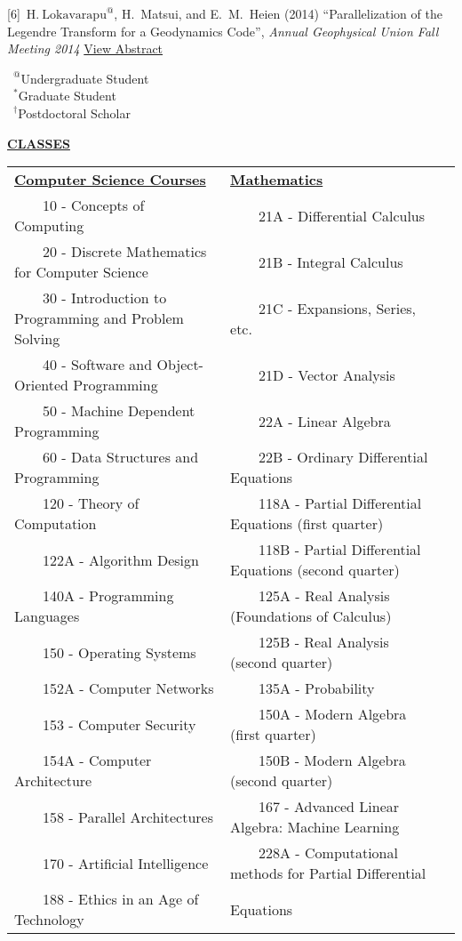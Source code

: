 \documentclass[11pt]{ltxdoc}
\newcommand{\tabitem}{~~\llap{\textbullet}~~}
\begin{document}
\hangindent 20pt
[6]~$\mathrm{H.~Lokavarapu}^{@}$, H.~Matsui, and E.~M.~Heien (2014) 
``Parallelization of the Legendre Transform for a Geodynamics Code'', 
\textit{Annual Geophysical Union Fall Meeting 2014}
\href{http://adsabs.harvard.edu/abs/2014AGUFMDI11A4255L}{View Abstract}

\vskip 18pt

$\phantom{0}^@$Undergraduate Student        \\
$\phantom{0}^*$Graduate Student             \\
$\phantom{0}^{\dagger}$Postdoctoral Scholar

\begin{center}
  \textbf{\underline{CLASSES}}
\end{center}

\vskip -6pt

\begin{tabular}{lll}
  \textbf{\underline{Computer Science Courses}} & \textbf{\underline{Mathematics}} \\
  \tabitem 10 - Concepts of Computing & \tabitem 21A - Differential Calculus \\
  \tabitem 20 - Discrete Mathematics for Computer Science & 	\tabitem 21B - Integral Calculus \\
  \tabitem 30 - Introduction to Programming and Problem Solving & 	\tabitem 21C - Expansions, Series, etc. \\
  \tabitem 40 - Software and Object-Oriented Programming & 	\tabitem 21D - Vector Analysis \\
  \tabitem 50 - Machine Dependent Programming & 	\tabitem 22A - Linear Algebra \\
  \tabitem 60 - Data Structures and Programming & 	\tabitem 22B - Ordinary Differential Equations \\
  \tabitem 120 - Theory of Computation & 	\tabitem 118A - Partial Differential Equations   (first quarter) \\
  \tabitem 122A - Algorithm Design & 	\tabitem 118B - Partial Differential Equations   (second quarter) \\
  \tabitem 140A - Programming Languages & 	\tabitem 125A - Real Analysis (Foundations of Calculus) \\
  \tabitem 150 - Operating Systems & 	\tabitem 125B - Real Analysis (second quarter) \\
  \tabitem 152A - Computer Networks & 	\tabitem 135A - Probability \\
  \tabitem 153 - Computer Security & 	\tabitem 150A - Modern Algebra (first quarter) \\
  \tabitem 154A - Computer Architecture & 	\tabitem 150B - Modern Algebra (second quarter) \\
  \tabitem 158 - Parallel Architectures & 	\tabitem 167  - Advanced Linear Algebra: Machine Learning \\
  \tabitem 170 - Artificial Intelligence & 	\tabitem 228A - Computational methods for Partial Differential \\
  \tabitem 188 - Ethics in an Age of Technology & \qquad\qquad Equations
\end{tabular}
\end{document}
